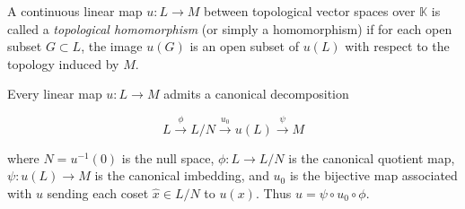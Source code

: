 A continuous linear map $u: L \to M$ between topological vector spaces over $\mathbb{K}$ is called a \textit{topological homomorphism} (or simply a homomorphism) if for each open subset $G \subset L$, the image $u(G)$ is an open subset of $u(L)$ with respect to the topology induced by $M$.

Every linear map $u: L \to M$ admits a canonical decomposition

$$L \xrightarrow{\phi} L/N \xrightarrow{u_0} u(L) \xrightarrow{\psi} M$$

where $N = u^{-1}(0)$ is the null space, $\phi: L \to L/N$ is the canonical quotient map, $\psi: u(L) \to M$ is the canonical imbedding, and $u_0$ is the bijective map associated with $u$ sending each coset $\hat{x} \in L/N$ to $u(x)$. Thus $u = \psi \circ u_0 \circ \phi$.
